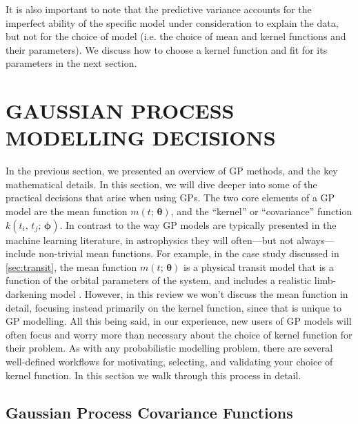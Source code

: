\documentclass[letterpaper]{ar-1col}
\newcommand{\hyperparams}{\ensuremath{\boldsymbol{\phi}}}
\newcommand{\meanparams}{\ensuremath{\boldsymbol{\theta}}}
\begin{document}
It is also important to note that the predictive variance accounts for the imperfect ability of the specific model under consideration to explain the data, but not for the choice of model (i.e. the choice of mean and kernel functions and their parameters). We discuss how to choose a kernel function and fit for its parameters in the next section.

\section{GAUSSIAN PROCESS MODELLING DECISIONS}
\label{sec:choices}

In the previous section, we presented an overview of GP methods, and the key mathematical details. In this section, we will dive deeper into some of the practical decisions that arise when using GPs.
The two core elements of a GP model are the mean function $m(t;\,\meanparams)$, and the ``kernel'' or ``covariance'' function $k(t_i,\,t_j;\,\hyperparams)$. In contrast to the way GP models are typically presented in the machine learning literature, in astrophysics they will often---but not always---include non-trivial mean functions.
For example, in the case study discussed in \autoref{sec:transit}, the mean function $m(t;\,\meanparams)$ is a physical transit model that is a function of the orbital parameters of the system, and includes a realistic limb-darkening model \citep{2002ApJ...580L.171M}.
However, in this review we won't discuss the mean function in detail, focusing instead primarily on the kernel function, since that is unique to GP modelling.
All this being said, in our experience, new users of GP models will often focus and worry more than necessary about the choice of kernel function for their problem.
As with any probabilistic modelling problem, there are several well-defined workflows for motivating, selecting, and validating your choice of kernel function.
In this section we walk through this process in detail.

\subsection{Gaussian Process Covariance Functions}
\label{sec:kernels}
\end{document}
